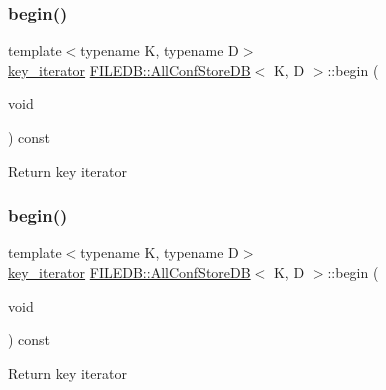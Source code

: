 \subsubsection{\texorpdfstring{begin()}{begin()}\hspace{0.1cm}{\footnotesize\ttfamily [1/3]}}
{\footnotesize\ttfamily template$<$typename K, typename D$>$ \\
\mbox{\hyperlink{classFILEDB_1_1AllConfStoreDB_a2ce8981ca7049ed0c2c6e438873a9c1b}{key\+\_\+iterator}} \mbox{\hyperlink{classFILEDB_1_1AllConfStoreDB}{F\+I\+L\+E\+D\+B\+::\+All\+Conf\+Store\+DB}}$<$ K, D $>$\+::begin (\begin{DoxyParamCaption}\item[{void}]{ }\end{DoxyParamCaption}) const\hspace{0.3cm}{\ttfamily [inline]}}

Return key iterator \mbox{\label{classFILEDB_1_1AllConfStoreDB_a7bb7f812d80471897860af5692eb5bd2}} 
\subsubsection{\texorpdfstring{begin()}{begin()}\hspace{0.1cm}{\footnotesize\ttfamily [2/3]}}
{\footnotesize\ttfamily template$<$typename K, typename D$>$ \\
\mbox{\hyperlink{classFILEDB_1_1AllConfStoreDB_a2ce8981ca7049ed0c2c6e438873a9c1b}{key\+\_\+iterator}} \mbox{\hyperlink{classFILEDB_1_1AllConfStoreDB}{F\+I\+L\+E\+D\+B\+::\+All\+Conf\+Store\+DB}}$<$ K, D $>$\+::begin (\begin{DoxyParamCaption}\item[{void}]{ }\end{DoxyParamCaption}) const\hspace{0.3cm}{\ttfamily [inline]}}

Return key iterator \mbox{\label{classFILEDB_1_1AllConfStoreDB_a7bb7f812d80471897860af5692eb5bd2}} 
